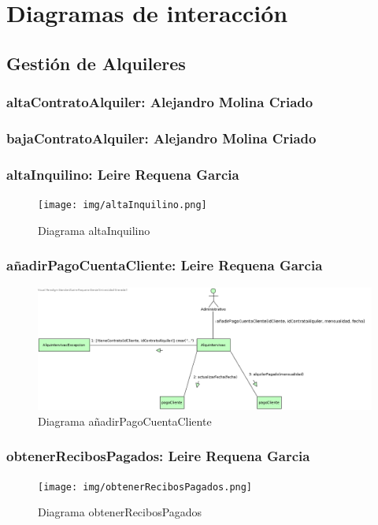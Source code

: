 \chapter{Diagramas de interacción}

\section{Gestión de Alquileres}
\subsection{altaContratoAlquiler: Alejandro Molina Criado}
\subsection{bajaContratoAlquiler: Alejandro Molina Criado}

\subsection{altaInquilino: Leire Requena Garcia}
\begin{figure}[!h]
  \centering
    \texttt{[image: img/altaInquilino.png]}
    \caption{Diagrama altaInquilino}
\end{figure}

\subsection{añadirPagoCuentaCliente: Leire Requena Garcia}
\begin{figure}[!h]
  \centering
    \includegraphics[scale=0.7]{img/añadirPagoCuentaCliente.png}
    \caption{Diagrama añadirPagoCuentaCliente}
\end{figure}

\subsection{obtenerRecibosPagados: Leire Requena Garcia}
\begin{figure}[!h]
  \centering
    \texttt{[image: img/obtenerRecibosPagados.png]}
    \caption{Diagrama obtenerRecibosPagados}
\end{figure}

